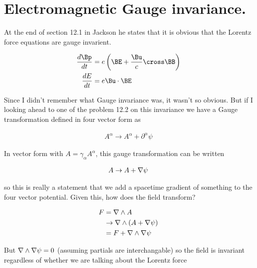 

\chapter{Electromagnetic Gauge invariance.}
\label{chap:jackson12Dash1Gauge}
{}
\date{Sept 24, 2009}

\beginArtNoToc

At the end of section 12.1 in Jackson \cite{jackson1975cew} he states that it is obvious that the Lorentz force equations are gauge invarient.

\begin{align}\label{eqn:jacksonGaugeInv:foo1}
\frac{d \Bp}{dt} &= e \left( \BE + \frac{\Bu}{c} \cross \BB \right) \\
\frac{d E}{dt} &= e \Bu \cdot \BE 
\end{align}

Since I didn't remember what Gauge invariance was, it wasn't so obvious.  But if I looking ahead to one of the problem 12.2 on this invariance we have a Gauge transformation defined in four vector form as

\begin{align}\label{eqn:jacksonGaugeInv:foo2}
A^\alpha \rightarrow A^\alpha + \partial^\alpha \psi
\end{align}

In vector form with $A = \gamma_\alpha A^\alpha$, this gauge transformation can be written

\begin{align}\label{eqn:jacksonGaugeInv:foo3}
A \rightarrow A + \nabla \psi
\end{align}

so this is really a statement that we add a spacetime gradient of something to the four vector potential.  Given this, how does the field transform?  

\begin{align*}
F 
&= \nabla \wedge A \\
&\rightarrow \nabla \wedge (A + \nabla \psi) \\
&= F + \nabla \wedge \nabla \psi
\end{align*}

But $\nabla \wedge \nabla \psi = 0$ (assuming partials are interchangable) so the field is invariant regardless of whether we are talking about the Lorentz force

